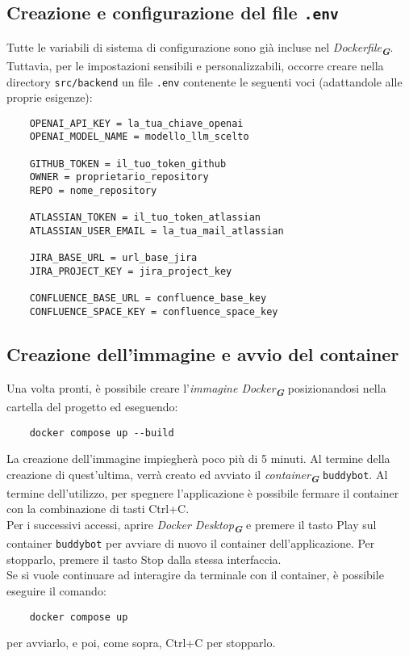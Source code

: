 \subsection{Creazione e configurazione del file \texttt{.env}}
Tutte le variabili di sistema di configurazione sono già incluse nel \emph{Dockerfile}\textsubscript{\textbf{\textit{G}}}.  
Tuttavia, per le impostazioni sensibili e personalizzabili, occorre creare nella directory \texttt{src/backend} un file
\texttt{.env} contenente le seguenti voci (adattandole alle proprie esigenze):
\begin{verbatim}
    OPENAI_API_KEY = la_tua_chiave_openai
    OPENAI_MODEL_NAME = modello_llm_scelto

    GITHUB_TOKEN = il_tuo_token_github
    OWNER = proprietario_repository
    REPO = nome_repository

    ATLASSIAN_TOKEN = il_tuo_token_atlassian
    ATLASSIAN_USER_EMAIL = la_tua_mail_atlassian

    JIRA_BASE_URL = url_base_jira
    JIRA_PROJECT_KEY = jira_project_key

    CONFLUENCE_BASE_URL = confluence_base_key
    CONFLUENCE_SPACE_KEY = confluence_space_key
\end{verbatim}

\subsection{Creazione dell'immagine e avvio del container}
Una volta pronti, è possibile creare l'\emph{immagine Docker}\textsubscript{\textbf{\textit{G}}} posizionandosi nella cartella del progetto ed eseguendo:
\begin{verbatim}
    docker compose up --build
\end{verbatim}
La creazione dell'immagine impiegherà poco più di 5 minuti.
Al termine della creazione di quest'ultima, verrà creato ed avviato il \emph{container}\textsubscript{\textbf{\textit{G}}} \texttt{buddybot}. Al termine dell'utilizzo, per
spegnere l'applicazione è possibile fermare il container con la combinazione di tasti Ctrl+C.\\
Per i successivi accessi, aprire \emph{Docker Desktop}\textsubscript{\textbf{\textit{G}}} e premere il tasto Play sul container \texttt{buddybot} per avviare di nuovo il
container dell'applicazione. Per stopparlo, premere il tasto Stop dalla stessa interfaccia.\\
Se si vuole continuare ad interagire da terminale con il container, è possibile eseguire il comando:
\begin{verbatim}
    docker compose up
\end{verbatim}
per avviarlo, e poi, come sopra, Ctrl+C per stopparlo.

